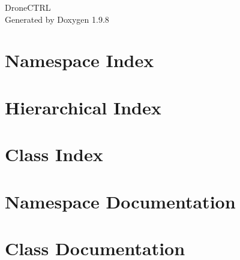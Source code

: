 \documentclass[twoside]{book}
\newcommand{\+}{\discretionary{\mbox{\scriptsize$\hookleftarrow$}}{}{}}
\newcommand{\clearemptydoublepage}{%
    \newpage{\pagestyle{empty}\cleardoublepage}%
  }
\begin{document}
  \raggedbottom
    \hypersetup{pageanchor=false,
                bookmarksnumbered=true,
                pdfencoding=unicode
               }
  \begin{titlepage}
  \vspace*{7cm}
  \begin{center}%
  {\Large Drone\+CTRL}\\
  \vspace*{1cm}
  {\large Generated by Doxygen 1.9.8}\\
  \end{center}
  \end{titlepage}
  \clearemptydoublepage
  \tableofcontents
  \clearemptydoublepage
  \hypersetup{pageanchor=true}

\chapter{Namespace Index}

\chapter{Hierarchical Index}

\chapter{Class Index}

\chapter{Namespace Documentation}

\chapter{Class Documentation}










  \backmatter
  \newpage
  \clearemptydoublepage
  \printindex
\end{document}
